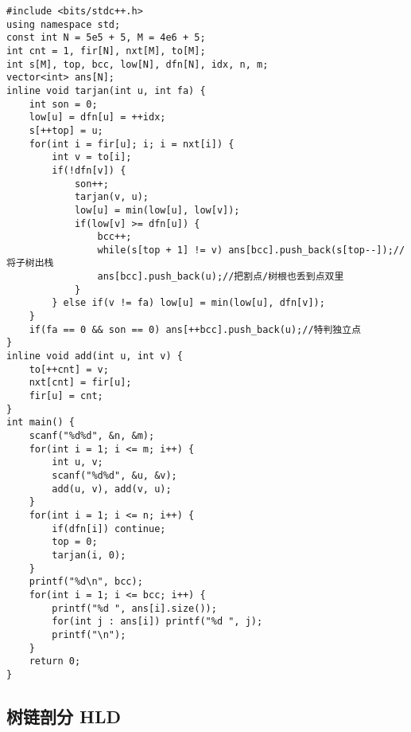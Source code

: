 \documentclass[]{article}
\begin{document}
\begin{verbatim}
#include <bits/stdc++.h>
using namespace std;
const int N = 5e5 + 5, M = 4e6 + 5;
int cnt = 1, fir[N], nxt[M], to[M];
int s[M], top, bcc, low[N], dfn[N], idx, n, m;
vector<int> ans[N];
inline void tarjan(int u, int fa) {
    int son = 0;
    low[u] = dfn[u] = ++idx;
    s[++top] = u;
    for(int i = fir[u]; i; i = nxt[i]) {
        int v = to[i];
        if(!dfn[v]) {
            son++;
            tarjan(v, u);
            low[u] = min(low[u], low[v]);
            if(low[v] >= dfn[u]) {
                bcc++;
                while(s[top + 1] != v) ans[bcc].push_back(s[top--]);//将子树出栈
                ans[bcc].push_back(u);//把割点/树根也丢到点双里
            }
        } else if(v != fa) low[u] = min(low[u], dfn[v]);
    }
    if(fa == 0 && son == 0) ans[++bcc].push_back(u);//特判独立点
}
inline void add(int u, int v) {
    to[++cnt] = v;
    nxt[cnt] = fir[u];
    fir[u] = cnt;
}
int main() {
    scanf("%d%d", &n, &m);
    for(int i = 1; i <= m; i++) {
        int u, v;
        scanf("%d%d", &u, &v);
        add(u, v), add(v, u);
    }
    for(int i = 1; i <= n; i++) {
        if(dfn[i]) continue;
        top = 0;
        tarjan(i, 0);
    }
    printf("%d\n", bcc);
    for(int i = 1; i <= bcc; i++) {
        printf("%d ", ans[i].size());
        for(int j : ans[i]) printf("%d ", j);
        printf("\n");
    }
    return 0;
}
\end{verbatim}

\hypertarget{ux6811ux94feux5256ux5206-hld}{%
\subsection{树链剖分 HLD}\label{ux6811ux94feux5256ux5206-hld}}
\end{document}
